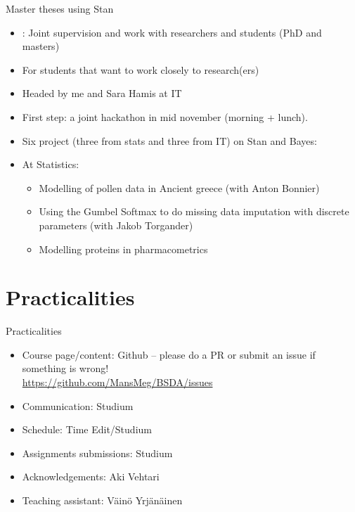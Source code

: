 \documentclass[10pt]{beamer}
\begin{document}
\begin{frame}{Master theses using Stan}

\begin{itemize}
\item {}: Joint supervision and work with researchers and students (PhD and masters)
\item For students that want to work closely to research(ers)
\item Headed by me and Sara Hamis at IT
\item First step: a joint hackathon in mid november (morning + lunch).
\pause
\item Six project (three from stats and three from IT) on Stan and Bayes:
\pause
\item At Statistics:
\begin{itemize}
\item Modelling of pollen data in Ancient greece (with Anton Bonnier)
\item Using the Gumbel Softmax to do missing data imputation with discrete parameters (with Jakob Torgander)
\item Modelling proteins in pharmacometrics
\end{itemize}
\end{itemize}
\end{frame}


\section{Practicalities}
\frame{\sectionpage}

\begin{frame}{Practicalities}

\begin{itemize}
\item Course page/content: Github -- please do a PR or submit an issue if something is wrong!\\ \url{https://github.com/MansMeg/BSDA/issues}\pause
\item Communication: Studium\pause
\item Schedule: Time Edit/Studium
\item Assignments submissions: Studium\pause
\item Acknowledgements: Aki Vehtari\pause
\item Teaching assistant: Väinö Yrjänäinen
\end{itemize}

\end{frame}
\end{document}
